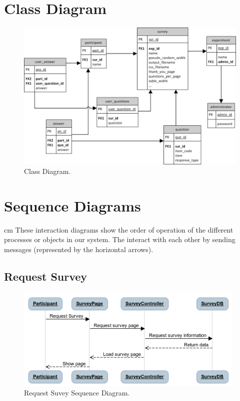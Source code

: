 \documentclass[a4paper,12pt,oneside]{report}
\begin{document}
\section{Class Diagram}
\vskip 2cm
\label{database}
\begin{figure}[h!]
  \begin{center}
   \includegraphics[width=15.5cm]{pics/class.png}
  \end{center}
\caption{Class Diagram.}
\end{figure}

\newpage

\section{Sequence Diagrams}
 cm
These interaction diagrams show the order of operation of the different processes or objects in our system. The interact with each other by sending messages (represented by the horizontal arrows).
\vskip 2.5cm
\subsection{Request Survey}
\vskip 1.5cm
\begin{figure}[!hp]
  \begin{center}
   \includegraphics[width=11cm]{pics/request.png}
  \end{center}
\caption{Request Suvey Sequence Diagram.}
\end{figure}
\newpage
\end{document}
